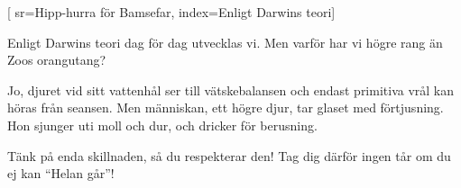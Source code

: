 [ 							
	sr={Hipp-hurra för Bamsefar},					
	index={Enligt Darwins teori}]		
	
\beginverse*						
Enligt Darwins teori
dag för dag utvecklas vi.
Men varför har vi högre rang
än Zoos orangutang?
\endverse						

\beginchorus
Jo, djuret vid sitt vattenhål
ser till vätskebalansen
och endast primitiva vrål
kan höras från seansen.
Men människan, ett högre djur,
tar glaset med förtjusning.
Hon sjunger uti moll och dur,
och dricker för berusning.
\endchorus

\beginverse				
Tänk på enda skillnaden,
så du respekterar den!
Tag dig därför ingen tår
om du ej kan ``Helan går''!
\endverse				
\endsong		
